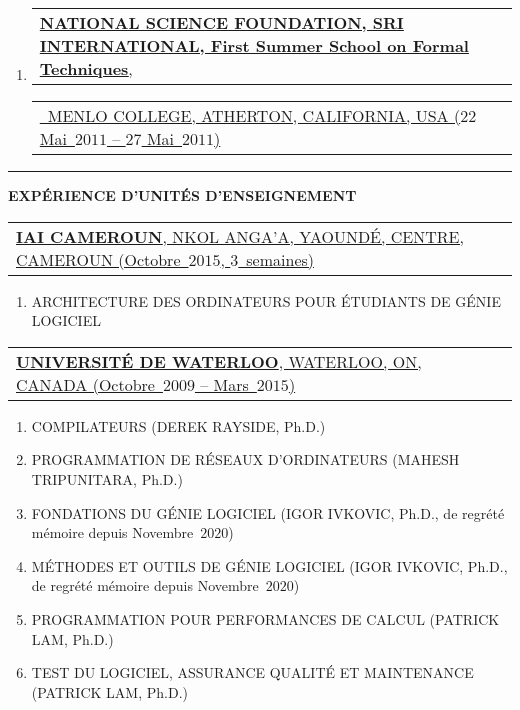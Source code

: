 \documentclass[9pt,a4paper]{article} %
\makeatletter
\newcommand{\headerrow}[2]
{\begin{tabular*}{\linewidth}{l@{\extracolsep{\fill}}r}
	#1 &
	#2 \\
\end{tabular*}}
\newcommand{\headerrowONE}[1]{\headerrow{#1}{}}
\newcommand{\cvitemdate}[2]{#1~$#2$\xspace}
\makeatother
\begin{document}
\vspace{0.5em}

\begin{enumerate}
	\item \headerrowONE{\href{http://fm.csl.sri.com/SSFT11/}{\textbf{NATIONAL SCIENCE FOUNDATION, SRI INTERNATIONAL, First Summer School on Formal Techniques},}}
			\headerrowONE{\href{http://fm.csl.sri.com/SSFT11}{\ \hfill  MENLO COLLEGE, ATHERTON, 
			CALIFORNIA, USA (\cvitemdate{$22$ Mai}{2011} -- \cvitemdate{$27$ Mai}{2011})}}

\end{enumerate}

\vspace{1em}


\hrule
\begin{center}
{\large \textbf{EXPÉRIENCE D'UNITÉS D'ENSEIGNEMENT}}
\end{center}

\vspace{0.5em}

\headerrowONE{\href{http://iaicameroun.com}{\textbf{IAI CAMEROUN}, NKOL ANGA'A, YAOUNDÉ, CENTRE, CAMEROUN (Octobre~$2015$, $3$~semaines)}}
\begin{enumerate}
	\item ARCHITECTURE DES ORDINATEURS POUR ÉTUDIANTS DE GÉNIE LOGICIEL
\end{enumerate}

\vspace{0.5em}

\headerrowONE{\href{http://ece.uwaterloo.ca}{\textbf{UNIVERSITÉ DE WATERLOO}, WATERLOO, ON, CANADA (Octobre~$2009$ -- Mars~$2015$)}}

\begin{enumerate}
	\itemsep -0.3em
	\item COMPILATEURS (DEREK RAYSIDE, Ph.D.)
	\item PROGRAMMATION DE RÉSEAUX D'ORDINATEURS (MAHESH TRIPUNITARA, Ph.D.)
	\item FONDATIONS DU GÉNIE LOGICIEL (IGOR IVKOVIC, Ph.D., de regrété mémoire depuis Novembre~$2020$)
	\item MÉTHODES ET OUTILS DE GÉNIE LOGICIEL (IGOR IVKOVIC, Ph.D., de regrété mémoire depuis Novembre~$2020$)
	\item PROGRAMMATION POUR PERFORMANCES DE CALCUL (PATRICK LAM, Ph.D.)
	\item TEST DU LOGICIEL, ASSURANCE QUALITÉ ET MAINTENANCE (PATRICK LAM, Ph.D.)
\end{enumerate}
\end{document}
